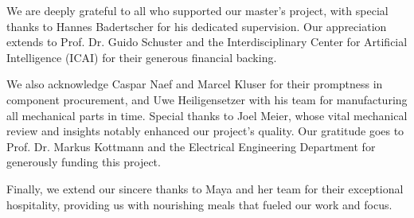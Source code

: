 \begin{acknowledgement}
	We are deeply grateful to all who supported our master's project, with special thanks to Hannes Badertscher for his dedicated supervision.
	Our appreciation extends to Prof. Dr. Guido Schuster and the Interdisciplinary Center for Artificial Intelligence (ICAI) for their generous financial backing.

	We also acknowledge Caspar Naef and Marcel Kluser for their promptness in component procurement,
	and Uwe Heiligensetzer with his team for manufacturing all mechanical parts in time.
	Special thanks to Joel Meier, whose vital mechanical review and insights notably enhanced our project's quality.
	Our gratitude goes to Prof. Dr. Markus Kottmann and the Electrical Engineering Department for generously funding this project.

	Finally, we extend our sincere thanks to Maya and her team for their exceptional hospitality, providing us with nourishing meals that fueled our work and focus.
\end{acknowledgement}
